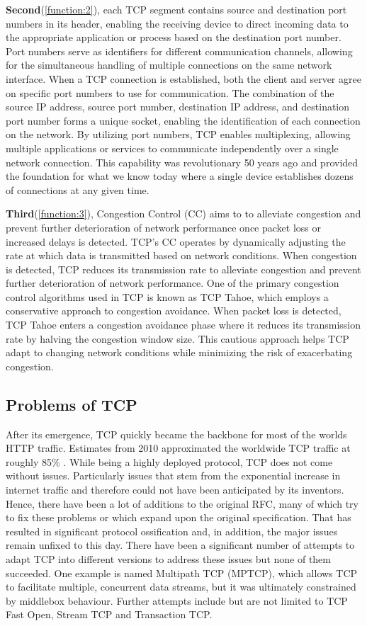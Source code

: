 \textbf{Second}(\ref{function:2}), each TCP segment contains source and destination port numbers in its header, enabling the receiving device to direct incoming data to the appropriate application or process based on the destination port number. Port numbers serve as identifiers for different communication channels, allowing for the simultaneous handling of multiple connections on the same network interface. When a TCP connection is established, both the client and server agree on specific port numbers to use for communication. The combination of the source IP address, source port number, destination IP address, and destination port number forms a unique socket, enabling the identification of each connection on the network. By utilizing port numbers, TCP enables multiplexing, allowing multiple applications or services to communicate independently over a single network connection. This capability was revolutionary 50 years ago and provided the foundation for what we know today where a single device establishes dozens of connections at any given time.

\textbf{Third}(\ref{function:3}), Congestion Control (CC) aims to to alleviate congestion and prevent further deterioration of network performance once packet loss or increased delays is detected. TCP's CC operates by dynamically adjusting the rate at which data is transmitted based on network conditions. When congestion is detected, TCP reduces its transmission rate to alleviate congestion and prevent further deterioration of network performance. One of the primary congestion control algorithms used in TCP is known as TCP Tahoe, which employs a conservative approach to congestion avoidance. When packet loss is detected, TCP Tahoe enters a congestion avoidance phase where it reduces its transmission rate by halving the congestion window size. This cautious approach helps TCP adapt to changing network conditions while minimizing the risk of exacerbating congestion.

\subsection{Problems of TCP}

After its emergence, TCP quickly became the backbone for most of the worlds HTTP traffic. Estimates from 2010 approximated the worldwide TCP traffic at roughly 85\% \cite{tcp-adoption}. While being a highly deployed protocol, TCP does not come without issues. Particularly issues that stem from the exponential increase in internet traffic and therefore could not have been anticipated by its inventors. Hence, there have been a lot of additions to the original RFC, many of which try to fix these problems or which expand upon the original specification. That has resulted in significant protocol ossification and, in addition, the major issues remain unfixed to this day. There have been a significant number of attempts to adapt TCP into different versions to address these issues but none of them succeeded. One example is named Multipath TCP (MPTCP), which allows TCP to facilitate multiple, concurrent data streams, but it was ultimately constrained by middlebox behaviour. Further attempts include but are not limited to TCP Fast Open, Stream TCP and Transaction TCP.

